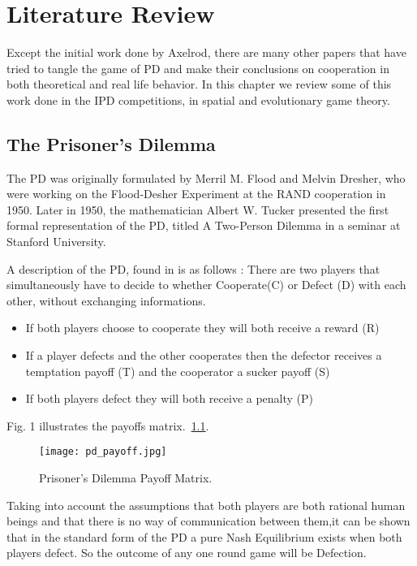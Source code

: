 \chapter{Literature Review}

Except the initial work done by Axelrod, there are many other papers that have tried
to tangle the game of PD and make their conclusions on cooperation in
both theoretical and real life behavior. In this chapter we review some of this work
done in the IPD competitions, in spatial and evolutionary game theory.

\section{The Prisoner's Dilemma}
The PD was originally formulated by Merril M. Flood and Melvin Dresher,
who were working on the Flood-Desher Experiment at the RAND cooperation in 1950.
Later in 1950, the mathematician Albert W. Tucker presented the first formal
representation of the PD, titled  A Two-Person Dilemma in a seminar at
Stanford University\parencite{Gass005}.

A description of the PD, found in \parencite{Li2011} is as follows :
There are two players that simultaneously have to decide to whether Cooperate(C)
or Defect (D) with each other, without exchanging informations.

\begin{itemize}
  \item If both players choose to cooperate they will both receive a reward (R)
  \item If a player defects and the other cooperates then the defector receives
  a temptation payoff (T) and the cooperator a sucker payoff (S)
  \item If both players defect they will both receive a penalty (P)
\end{itemize}

Fig. 1 illustrates the payoffs matrix.~\ref{fig:pd_payoff}.

\begin{figure}[h!]
\centering
\texttt{[image: pd\_payoff.jpg]}
\caption{Prisoner's Dilemma Payoff Matrix.\parencite{Li2011}}
\label{fig:pd_payoff}
\end{figure}

Taking into account the assumptions that both players are both rational human beings and
that there is no way of communication between them,it can be shown that in the standard
form of the PD a pure Nash Equilibrium exists when both players defect.
So the outcome of any one round game will be Defection.

